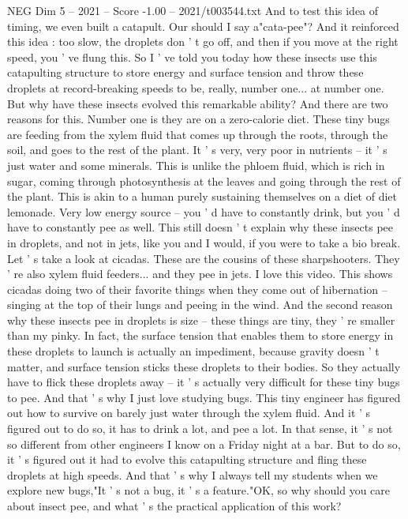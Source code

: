 \begin{textsample}{NEG Dim 5 – 2021 – Score -1.00 – 2021/t003544.txt}
And to test this idea of timing, we even built a catapult.
Our should I say a"cata-pee"?
And it reinforced this idea : too slow, the droplets don ' t go off, and then if you move at the right speed, you ' ve flung this.
So I ' ve told you today how these insects use this catapulting structure to store energy and surface tension and throw these droplets at record-breaking speeds to be, really, number one... at number one.
But why have these insects evolved this remarkable ability?
And there are two reasons for this.
Number one is they are on a zero-calorie diet.
These tiny bugs are feeding from the xylem fluid that comes up through the roots, through the soil, and goes to the rest of the plant.
It ' s very, very poor in nutrients -- it ' s just water and some minerals.
This is unlike the phloem fluid, which is rich in sugar, coming through photosynthesis at the leaves and going through the rest of the plant.
This is akin to a human purely sustaining themselves on a diet of diet lemonade.
Very low energy source -- you ' d have to constantly drink, but you ' d have to constantly pee as well.
This still doesn ' t explain why these insects pee in droplets, and not in jets, like you and I would, if you were to take a bio break.
Let ' s take a look at cicadas.
These are the cousins of these sharpshooters.
They ' re also xylem fluid feeders... and they pee in jets.
I love this video.
This shows cicadas doing two of their favorite things when they come out of hibernation -- singing at the top of their lungs and peeing in the wind.
And the second reason why these insects pee in droplets is size -- these things are tiny, they ' re smaller than my pinky.
In fact, the surface tension that enables them to store energy in these droplets to launch is actually an impediment, because gravity doesn ' t matter, and surface tension sticks these droplets to their bodies.
So they actually have to flick these droplets away -- it ' s actually very difficult for these tiny bugs to pee.
And that ' s why I just love studying bugs.
This tiny engineer has figured out how to survive on barely just water through the xylem fluid.
And it ' s figured out to do so, it has to drink a lot, and pee a lot.
In that sense, it ' s not so different from other engineers I know on a Friday night at a bar.
But to do so, it ' s figured out it had to evolve this catapulting structure and fling these droplets at high speeds.
And that ' s why I always tell my students when we explore new bugs,"It ' s not a bug, it ' s a feature."OK, so why should you care about insect pee, and what ' s the practical application of this work?

\end{textsample}
